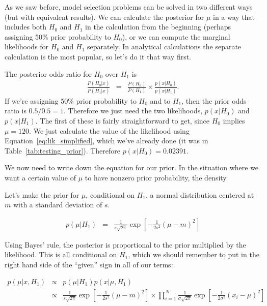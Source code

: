 As we saw before, model selection problems can be solved in two different ways
(but with equivalent results). We can calculate the posterior for $\mu$ in
a way that includes both $H_0$ and $H_1$ in the calculation from the beginning
(perhaps assigning 50\% prior probability to $H_0$), or we can compute the
marginal likelihoods for $H_0$ and $H_1$ separately. In analytical calculations
the separate calculation is the most popular, so let's do it that way first.

The posterior odds ratio for $H_0$ over $H_1$ is
\begin{eqnarray}
\frac{P(H_0 | x)}{P(H_1|x)} &=& \frac{P(H_0)}{P(H_1)} \times
\frac{p(x|H_0)}{p(x|H_1)}\label{eq:odds_form2}.
\end{eqnarray}
If we're assigning 50\% prior probability to $H_0$ and to $H_1$, then the
prior odds ratio is $0.5 / 0.5 = 1$. Therefore we just need the two likelihoods,
$p(x | H_0)$ and $p(x | H_1)$. The first of these is fairly straightforward to
get, since $H_0$ implies $\mu = 120$. We just calculate the value of the
likelihood using Equation~\ref{eq:lik_simplified}, which we've already done
(it was in Table~\ref{tab:testing_prior}). Therefore
$p(x | H_0) = 0.02391$.


We now need to write down the equation for our prior. In the situation where
we want a certain value of $\mu$ to have nonzero prior probability, the density




Let's make the prior for $\mu$, conditional on $H_1$, a normal distribution
centered at $m$ with a standard deviation of $s$.

\begin{eqnarray}
p(\mu | H_1) &=& \frac{1}{s\sqrt{2\pi}}\exp
\left[-\frac{1}{2s^2}\left(\mu - m\right)^2\right]
\end{eqnarray}

Using Bayes' rule, the posterior is proportional to the prior multiplied by
the likelihood. This is all conditional on $H_1$, which we should remember
to put in the right hand side of the ``given'' sign in all of our terms:

\begin{eqnarray}
p(\mu | x, H_1) &\propto& p(\mu | H_1)p(x | \mu, H_1) \\
&\propto&
\frac{1}{s\sqrt{2\pi}}\exp
\left[-\frac{1}{2s^2}\left(\mu - m\right)^2\right]
\times
\prod_{i=1}^N \frac{1}{\sigma\sqrt{2\pi}}
\exp
\left[-\frac{1}{2\sigma^2}\left(x_i - \mu\right)^2\right]
\end{eqnarray}

